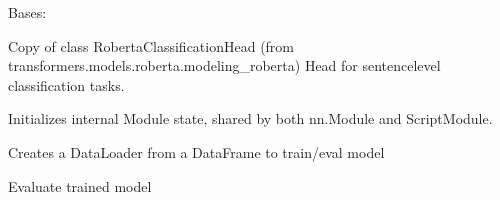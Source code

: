 \documentclass[letterpaper,10pt,english]{sphinxmanual}
\begin{document}
\begin{fulllineitems}
\label{\detokenize{dc_custom_model:src.domain_classifier.custom_model.CustomModel}}
\sphinxAtStartPar
Bases: 

\sphinxAtStartPar
Copy of class RobertaClassificationHead
(from transformers.models.roberta.modeling\_roberta)
Head for sentence\sphinxhyphen{}level classification tasks.

\begin{fulllineitems}
\label{\detokenize{dc_custom_model:src.domain_classifier.custom_model.CustomModel.__init__}}
\sphinxAtStartPar
Initializes internal Module state, shared by both nn.Module and ScriptModule.

\end{fulllineitems}


\begin{fulllineitems}
\label{\detokenize{dc_custom_model:src.domain_classifier.custom_model.CustomModel.create_data_loader}}
\sphinxAtStartPar
Creates a DataLoader from a DataFrame to train/eval model

\end{fulllineitems}


\begin{fulllineitems}
\label{\detokenize{dc_custom_model:src.domain_classifier.custom_model.CustomModel.eval_model}}
\sphinxAtStartPar
Evaluate trained model


\end{fulllineitems}
\end{fulllineitems}
\end{document}

